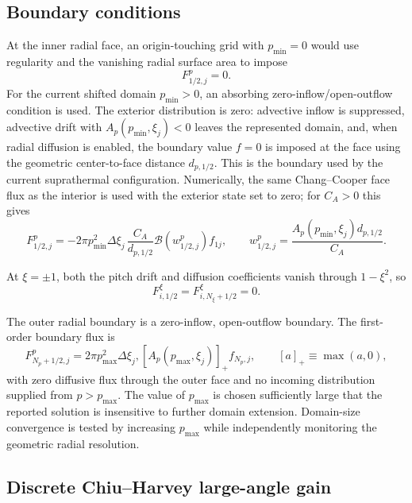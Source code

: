 \documentclass[11pt]{article}
\begin{document}
\subsection{Boundary conditions}

At the inner radial face, an origin-touching grid with $p_{\min}=0$ would use regularity
and the vanishing radial surface area to impose
\begin{equation}
 F^p_{1/2,j}=0.
 \label{eq:inner_zero_flux}
\end{equation}
For the current shifted domain $p_{\min}>0$, an absorbing zero-inflow/open-outflow
condition is used.  The exterior distribution is zero: advective inflow is suppressed,
advective drift with $A_p(p_{\min},\xi_j)<0$ leaves the represented domain, and, when
radial diffusion is enabled, the boundary value $f=0$ is imposed at the face using the
geometric center-to-face distance $d_{p,1/2}$.  This is the boundary used by the current
suprathermal configuration.
Numerically, the same Chang--Cooper face flux as the interior is used with the exterior
state set to zero; for $C_A>0$ this gives
\begin{equation}
 F^p_{1/2,j}=-2\pi p_{\min}^2\Delta\xi_j\,
 \frac{C_A}{d_{p,1/2}}\mathcal B(w^p_{1/2,j})f_{1j},
 \qquad
 w^p_{1/2,j}=\frac{A_p(p_{\min},\xi_j)d_{p,1/2}}{C_A}.
 \label{eq:inner_absorbing_flux}
\end{equation}

At $\xi=\pm1$, both the pitch drift and diffusion coefficients vanish through
$1-\xi^2$, so
\begin{equation}
 F^\xi_{i,1/2}=F^\xi_{i,N_\xi+1/2}=0.
 \label{eq:pitch_boundary_flux}
\end{equation}

The outer radial boundary is a zero-inflow, open-outflow boundary.  The first-order
boundary flux is
\begin{equation}
 F^p_{N_p+1/2,j}
 =2\pi p_{\max}^2\Delta\xi_j,
  \left[A_p(p_{\max},\xi_j)\right]_+ f_{N_p,j},
 \qquad [a]_+\equiv\max(a,0),
 \label{eq:outer_flux}
\end{equation}
with zero diffusive flux through the outer face and no incoming distribution supplied
from $p>p_{\max}$.  The value of $p_{\max}$ is chosen sufficiently large that the
reported solution is insensitive to further domain extension.  Domain-size convergence
is tested by increasing $p_{\max}$ while independently monitoring the geometric radial
resolution.

\subsection{Discrete Chiu--Harvey large-angle gain}
\end{document}

